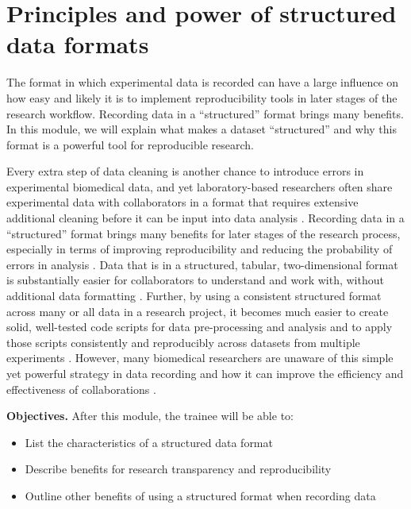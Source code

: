 \documentclass[]{tufte-book}
\providecommand{\tightlist}{%
  \setlength{\itemsep}{0pt}\setlength{\parskip}{0pt}}
\begin{document}
\hypertarget{principles-and-power-of-structured-data-formats}{%
\section{Principles and power of structured data formats}\label{principles-and-power-of-structured-data-formats}}

The format in which experimental data is recorded can have a large influence on
how easy and likely it is to implement reproducibility tools in later stages of
the research workflow. Recording data in a ``structured'' format brings many
benefits. In this module, we will explain what makes a dataset ``structured'' and
why this format is a powerful tool for reproducible research.

Every extra step of data cleaning is another chance to introduce errors in
experimental biomedical data, and yet laboratory-based researchers often share
experimental data with collaborators in a format that requires extensive
additional cleaning before it can be input into data analysis
\citep{broman2018data}. Recording data in a ``structured'' format brings many
benefits for later stages of the research process, especially in terms of
improving reproducibility and reducing the probability of errors in analysis
\citep{ellis2018share}. Data that is in a structured, tabular, two-dimensional
format is substantially easier for collaborators to understand and work with,
without additional data formatting \citep{broman2018data}. Further, by using a
consistent structured format across many or all data in a research project, it
becomes much easier to create solid, well-tested code scripts for data
pre-processing and analysis and to apply those scripts consistently and
reproducibly across datasets from multiple experiments \citep{broman2018data}.
However, many biomedical researchers are unaware of this simple yet powerful
strategy in data recording and how it can improve the efficiency and
effectiveness of collaborations \citep{ellis2018share}.

\textbf{Objectives.} After this module, the trainee will be able to:

\begin{itemize}
\tightlist
\item
  List the characteristics of a structured data format
\item
  Describe benefits for research transparency and reproducibility
\item
  Outline other benefits of using a structured format when recording data
\end{itemize}
\end{document}
